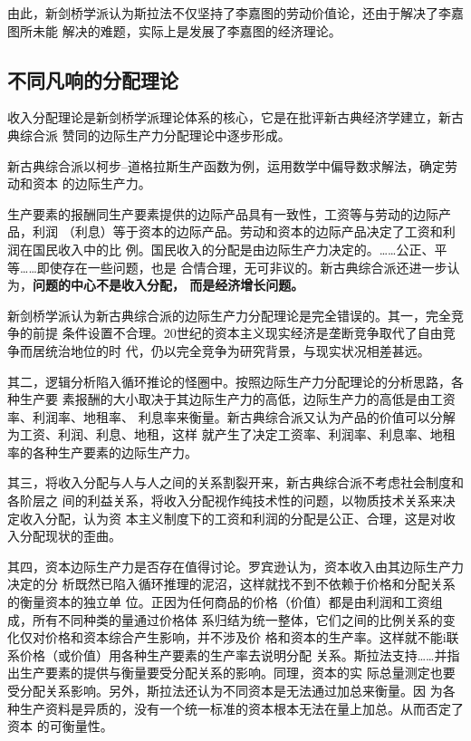 由此，新剑桥学派认为斯拉法不仅坚持了李嘉图的劳动价值论，还由于解决了李嘉图所未能
解决的难题，实际上是发展了李嘉图的经济理论。

\subsection{不同凡响的分配理论}

收入分配理论是新剑桥学派理论体系的核心，它是在批评新古典经济学建立，新古典综合派
赞同的边际生产力分配理论中逐步形成。

新古典综合派以柯步--道格拉斯生产函数为例，运用数学中偏导数求解法，确定劳动和资本
的边际生产力。

生产要素的报酬同生产要素提供的边际产品具有一致性，工资等与劳动的边际产品，利润
（利息）等于资本的边际产品。劳动和资本的边际产品决定了工资和利润在国民收入中的比
例。国民收入的分配是由边际生产力决定的。……公正、平等……即使存在一些问题，也是
合情合理，无可非议的。新古典综合派还进一步认为，\textbf{问题的中心不是收入分配，
  而是经济增长问题。}

新剑桥学派认为新古典综合派的边际生产力分配理论是完全错误的。其一，完全竞争的前提
条件设置不合理。20世纪的资本主义现实经济是垄断竞争取代了自由竞争而居统治地位的时
代，仍以完全竞争为研究背景，与现实状况相差甚远。

其二，逻辑分析陷入循环推论的怪圈中。按照边际生产力分配理论的分析思路，各种生产要
素报酬的大小取决于其边际生产力的高低，边际生产力的高低是由工资率、利润率、地租率、
利息率来衡量。新古典综合派又认为产品的价值可以分解为工资、利润、利息、地租，这样
就产生了决定工资率、利润率、利息率、地租率的各种生产要素的边际生产力。

其三，将收入分配与人与人之间的关系割裂开来，新古典综合派不考虑社会制度和各阶层之
间的利益关系，将收入分配视作纯技术性的问题，以物质技术关系来决定收入分配，认为资
本主义制度下的工资和利润的分配是公正、合理，这是对收入分配现状的歪曲。

其四，资本边际生产力是否存在值得讨论。罗宾逊认为，资本收入由其边际生产力决定的分
析既然已陷入循环推理的泥沼，这样就找不到不依赖于价格和分配关系的衡量资本的独立单
位。正因为任何商品的价格（价值）都是由利润和工资组成，所有不同种类的量通过价格体
系归结为统一整体，它们之间的比例关系的变化仅对价格和资本综合产生影响，并不涉及价
格和资本的生产率。这样就不能i联系价格（或价值）用各种生产要素的生产率去说明分配
关系。斯拉法支持……并指出生产要素的提供与衡量要受分配关系的影响。同理，资本的实
际总量测定也要受分配关系影响。另外，斯拉法还认为不同资本是无法通过加总来衡量。因
为各种生产资料是异质的，没有一个统一标准的资本根本无法在量上加总。从而否定了资本
的可衡量性。

